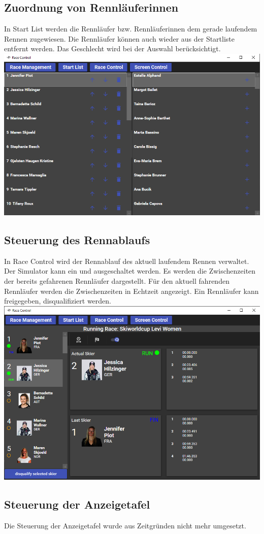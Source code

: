\documentclass[a4paper, 12pt]{article}
\begin{document}
	\subsection{Zuordnung von Rennläuferinnen}
	In Start List werden die Rennläufer bzw. Rennläuferinnen dem gerade laufendem Rennen zugewiesen. Die Rennläufer können auch wieder aus der Startliste entfernt werden. Das Geschlecht wird bei der Auswahl berücksichtigt.
	\newline
	\includegraphics[width=.7\textwidth]{img/ui_startList.png}
	\newline
	
	\subsection{Steuerung des Rennablaufs}
	In Race Control wird der Rennablauf des aktuell laufendem Rennen verwaltet. Der Simulator kann ein und ausgeschaltet werden. Es werden die Zwischenzeiten der bereits gefahrenen Rennläufer dargestellt. Für den aktuell fahrenden Rennläufer werden die Zwischenzeiten in Echtzeit angezeigt. Ein Rennläufer kann freigegeben, disqualifiziert werden.
	\newline
	\includegraphics[width=.7\textwidth]{img/ui_raceControl.png}
	\newline
	
	
	\subsection{Steuerung der Anzeigetafel}
	Die Steuerung der Anzeigetafel wurde aus Zeitgründen nicht mehr umgesetzt.
	
\end{document}
